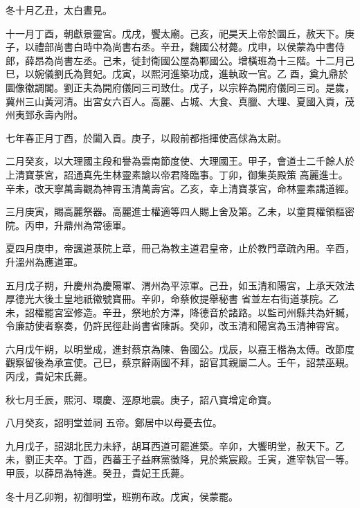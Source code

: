\begin{pinyinscope}
 冬十月乙丑，太白晝見。



 十一月丁酉，朝獻景靈宮。戊戌，饗太廟。己亥，祀昊天上帝於圜丘，赦天下。庚子，以禮部尚書白時中為尚書右丞。辛丑，魏國公材薨。戊申，以侯蒙為中書侍郎，薛昂為尚書左丞。己未，徙封衛國公屋為鄆國公。增橫班為十三階。十二月己巳，以婉儀劉氏為賢妃。戊寅，以熙河進築功成，進執政一官。乙
 酉，奠九鼎於圜像徽調閣。劉正夫為開府儀同三司致仕。戊子，以宗粹為開府儀同三司。是歲，冀州三山黃河清。出宮女六百人。高麗、占城、大食、真臘、大理、夏國入貢，茂州夷郅永壽內附。



 七年春正月丁酉，於闐入貢。庚子，以殿前都指揮使高俅為太尉。



 二月癸亥，以大理國主段和譽為雲南節度使、大理國王。甲子，會道士二千餘人於上清寶菉宮，詔通真先生林靈素諭以帝君降臨事。丁卯，御集英殿策
 高麗進士。辛未，改天寧萬壽觀為神霄玉清萬壽宮。乙亥，幸上清寶菉宮，命林靈素講道經。



 三月庚寅，賜高麗祭器。高麗進士權適等四人賜上舍及第。乙未，以童貫權領樞密院。丙申，升鼎州為常德軍。



 夏四月庚申，帝諷道菉院上章，冊己為教主道君皇帝，止於教門章疏內用。辛酉，升溫州為應道軍。



 五月戊子朔，升慶州為慶陽軍、渭州為平涼軍。己丑，如玉清和陽宮，上承天效法厚德光大後土皇地祇徽號寶冊。辛卯，命蔡攸提舉秘書
 省並左右街道菉院。乙未，詔權罷宮室修造。辛丑，祭地於方澤，降德音於諸路。以監司州縣共為奸贓，令廉訪使者察奏，仍許民徑赴尚書省陳訴。癸卯，改玉清和陽宮為玉清神霄宮。



 六月戊午朔，以明堂成，進封蔡京為陳、魯國公。戊辰，以嘉王楷為太傅。改節度觀察留後為承宣使。己巳，蔡京辭兩國不拜，詔官其親屬二人。壬午，詔禁巫覡。丙戌，貴妃宋氏薨。



 秋七月壬辰，熙河、環慶、涇原地震。庚子，詔八寶增定命寶。



 八月癸亥，詔明堂並祠
 五帝。鄭居中以母憂去位。



 九月戊子，詔湖北民力未紓，胡耳西道可罷進築。辛卯，大饗明堂，赦天下。乙未，劉正夫卒。丁酉，西蕃王子益麻黨徵降，見於紫宸殿。壬寅，進宰執官一等。甲辰，以薛昂為特進。癸丑，貴妃王氏薨。



 冬十月乙卯朔，初御明堂，班朔布政。戊寅，侯蒙罷。




\end{pinyinscope}
